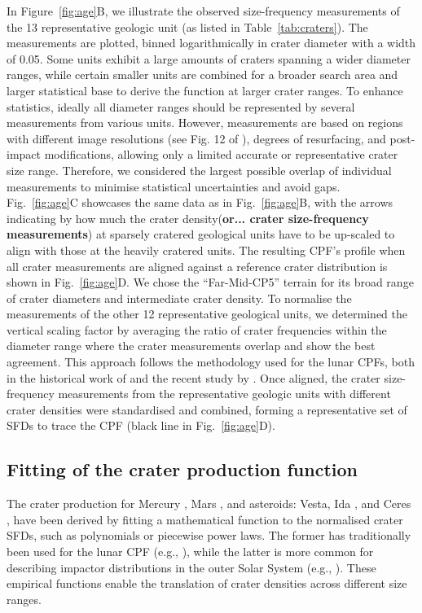 \documentclass[preprint,12pt,3p,times,authoryear]{elsarticle}
\begin{document}
In Figure~\ref{fig:age}B, we illustrate the observed size-frequency measurements of the 13 representative geologic unit (as listed in Table~\ref{tab:craters}). The measurements are plotted, binned logarithmically in crater diameter with a width of 0.05.
Some units exhibit a large amounts of craters spanning a wider diameter ranges, while certain smaller units are combined for a broader search area and larger statistical base to derive the function at larger crater ranges. To enhance statistics, ideally all diameter ranges should be represented by several measurements from various units. However, measurements are based on regions with different image resolutions (see Fig. 12 of \citealt{Bland2018}), degrees of resurfacing, and post-impact modifications, allowing only a limited accurate or representative crater size range. Therefore, we considered the largest possible overlap of individual measurements to minimise statistical uncertainties and avoid gaps.\\

Fig.~\ref{fig:age}C showcases the same data as in Fig.~\ref{fig:age}B, with the arrows indicating by how much the crater density(\textbf{or... crater size-frequency measurements}) at sparsely cratered geological units have to be up-scaled to align with those at the heavily cratered units. 
The resulting CPF's profile when all crater measurements are aligned against a reference crater distribution is shown in Fig.~\ref{fig:age}D. We chose the ``Far-Mid-CP5'' terrain for its broad range of crater diameters and intermediate crater density. To normalise the measurements of the other 12 representative geological units, we determined the vertical scaling factor by averaging the ratio of crater frequencies within the diameter range where the crater measurements overlap and show the best agreement. 
This approach follows the methodology used for the lunar CPFs, both in the historical work of \citet{Neukum1975} and the recent study by \citet{Xiao2024}. Once aligned, the crater size-frequency measurements from the representative geologic units with different crater densities were standardised and combined, forming a representative set of SFDs to trace the CPF (black line in Fig.~\ref{fig:age}D).\\

\subsection{Fitting of the crater production function}
\label{subsec:fitting}
The crater production for Mercury \citep{Neukum2001}, Mars \citep{Ivanov2001, Hartmann2005}, and asteroids: Vesta, Ida \citep{Schmedemann2014}, and Ceres \citep{Hiesinger2016}, have been derived by fitting a mathematical function to the normalised crater SFDs, such as polynomials or piecewise power laws. The former has traditionally been used for the lunar CPF (e.g., \citealt{Neukum2001}), while the latter is more common for describing impactor distributions in the outer Solar System (e.g., \citealt{Zahnle2003}). These empirical functions enable the translation of crater densities across different size ranges. \\
\end{document}
